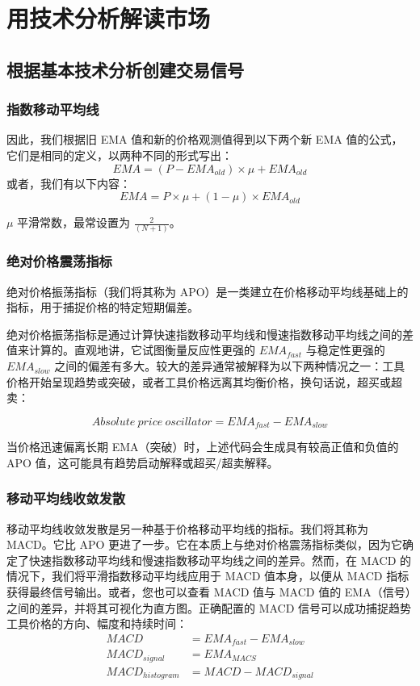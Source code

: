 \chapter{用技术分析解读市场}
\section{根据基本技术分析创建交易信号}
\subsection{指数移动平均线}
因此，我们根据旧 EMA 值和新的价格观测值得到以下两个新 EMA 值的公式，它们是相同的定义，以两种不同的形式写出：
$$EMA=(P-EMA_{old})\times\mu+EMA_{old}$$
或者，我们有以下内容：
$$EMA=P\times\mu+(1-\mu)\times EMA_{old}$$

$\mu$ 平滑常数，最常设置为 $\frac{2}{(N+1)}$。
\subsection{绝对价格震荡指标}
绝对价格振荡指标（我们将其称为 APO）是一类建立在价格移动平均线基础上的指标，用于捕捉价格的特定短期偏差。

绝对价格振荡指标是通过计算快速指数移动平均线和慢速指数移动平均线之间的差值来计算的。直观地讲，它试图衡量反应性更强的 $EMA_{fast}$ 与稳定性更强的 $EMA_{slow}$ 之间的偏差有多大。较大的差异通常被解释为以下两种情况之一：工具价格开始呈现趋势或突破，或者工具价格远离其均衡价格，换句话说，超买或超卖：

$$Absolute~price~oscillator=EMA_{fast}-EMA_{slow}$$

当价格迅速偏离长期 EMA（突破）时，上述代码会生成具有较高正值和负值的 APO 值，这可能具有趋势启动解释或超买/超卖解释。

\subsection{移动平均线收敛发散}
移动平均线收敛发散是另一种基于价格移动平均线的指标。我们将其称为 MACD。它比 APO 更进了一步。它在本质上与绝对价格震荡指标类似，因为它确定了快速指数移动平均线和慢速指数移动平均线之间的差异。然而，在 MACD 的情况下，我们将平滑指数移动平均线应用于 MACD 值本身，以便从 MACD 指标获得最终信号输出。或者，您也可以查看 MACD 值与 MACD 值的 EMA（信号）之间的差异，并将其可视化为直方图。正确配置的 MACD 信号可以成功捕捉趋势工具价格的方向、幅度和持续时间：
\begin{equation}
    \begin{aligned}
        MACD             & =EMA_{fast}-EMA_{slow} \\
        MACD_{signal}    & =EMA_{MACS}            \\
        MACD_{histogram} & =MACD-MACD_{signal}    \\
    \end{aligned}
\end{equation}
